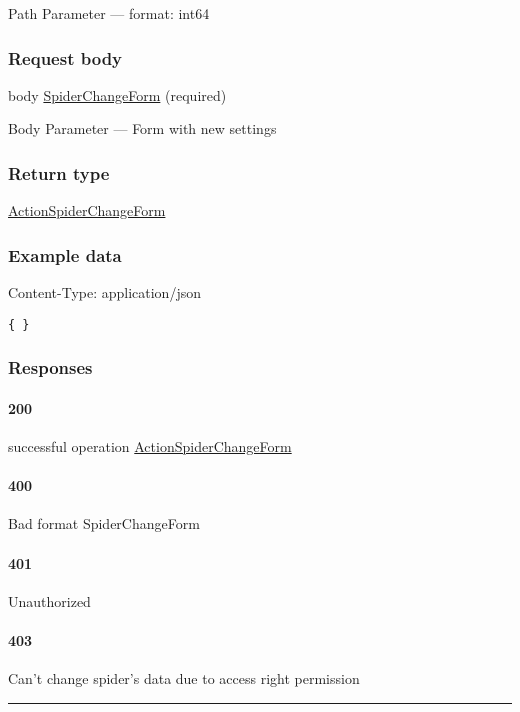 {Path Parameter} --- format: int64

\hypertarget{request-body}{%
\subsubsection*{Request body}\label{request-body}}

body \protect\hyperlink{SpiderChangeForm}{SpiderChangeForm} (required)

{Body Parameter} --- Form with new settings

\hypertarget{return-type-1}{%
\subsubsection*{Return type}\label{return-type-1}}

\protect\hyperlink{ActionSpiderChangeForm}{ActionSpiderChangeForm}

\hypertarget{example-data-1}{%
\subsubsection*{Example data}\label{example-data-1}}

Content-Type: application/json

\begin{verbatim}
{ }
\end{verbatim}

\hypertarget{responses-1}{%
\subsubsection*{Responses}\label{responses-1}}

\hypertarget{section-5}{%
\paragraph{200}\label{section-5}}

successful operation
\protect\hyperlink{ActionSpiderChangeForm}{ActionSpiderChangeForm}

\hypertarget{section-6}{%
\paragraph{400}\label{section-6}}

Bad format SpiderChangeForm \protect\hyperlink{}{}

\hypertarget{section-7}{%
\paragraph{401}\label{section-7}}

Unauthorized \protect\hyperlink{}{}

\hypertarget{section-8}{%
\paragraph{403}\label{section-8}}

Can't change spider's data due to access right permission
\protect\hyperlink{}{}

\begin{center}\rule{0.5\linewidth}{0.5pt}\end{center}
